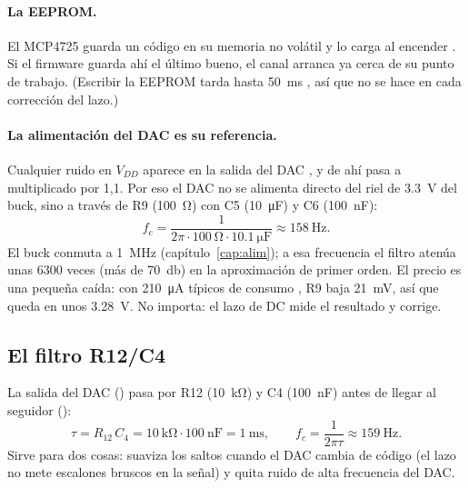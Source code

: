 \paragraph{La EEPROM.} El MCP4725 guarda un código en su memoria no volátil y lo carga al encender
. Si el firmware guarda ahí el último  bueno, el canal arranca ya cerca de su punto de
trabajo. (Escribir la EEPROM tarda hasta \SI{50}{\milli\second} , así que no se hace en cada
corrección del lazo.)

\paragraph{La alimentación del DAC es su referencia.} Cualquier ruido en $V_{DD}$ aparece en la salida del DAC
, y de ahí pasa a  multiplicado por 1,1. Por eso el DAC no se alimenta directo del
riel de \SI{3.3}{\volt} del buck, sino a través de R9 (\SI{100}{\ohm}) con C5 (\SI{10}{\micro\farad}) y C6
(\SI{100}{\nano\farad}):
\begin{equation*}
  f_c = \frac{1}{2\pi\cdot\SI{100}{\ohm}\cdot\SI{10.1}{\micro\farad}} \approx \SI{158}{\hertz}.
\end{equation*}
El buck conmuta a \SI{1}{\mega\hertz} (capítulo~\ref{cap:alim}); a esa frecuencia el filtro atenúa unas
$\num{6300}$ veces (más de \SI{70}{\decibel}) en la aproximación de primer orden. El precio es una pequeña caída:
con \SI{210}{\micro\ampere} típicos de consumo , R9 baja \SI{21}{\milli\volt}, así que
 queda en unos \SI{3.28}{\volt}. No importa: el lazo de DC mide el resultado y corrige.

\subsection{El filtro R12/C4}

La salida del DAC () pasa por R12 (\SI{10}{\kilo\ohm}) y C4 (\SI{100}{\nano\farad}) antes de llegar al
seguidor ():
\begin{equation*}
  \tau = R_{12}\,C_4 = \SI{10}{\kilo\ohm}\cdot\SI{100}{\nano\farad} = \SI{1}{\milli\second}, \qquad
  f_c = \frac{1}{2\pi\tau} \approx \SI{159}{\hertz}.
\end{equation*}
Sirve para dos cosas: suaviza los saltos cuando el DAC cambia de código (el lazo no mete escalones bruscos en la señal)
y quita ruido de alta frecuencia del DAC.

